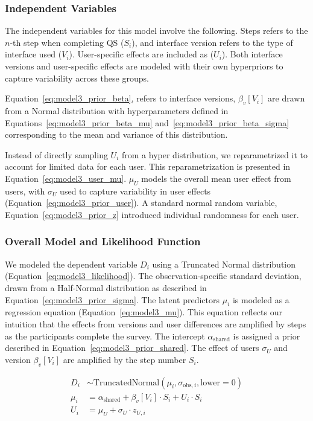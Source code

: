 \subsubsection{Independent Variables}
The independent variables for this model involve the following. Steps refers to the $n$-th step when completing QS ($S_i$), and interface version refers to the type of interface used ($V_i$). User-specific effects are included as ($U_i$). Both interface versions and user-specific effects are modeled with their own hyperpriors to capture variability across these groups. 

Equation~\ref{eq:model3_prior_beta}, refers to interface versions, $\beta_v[V_i]$ are drawn from a Normal distribution with hyperparameters defined in Equations~\ref{eq:model3_prior_beta_mu} and~\ref{eq:model3_prior_beta_sigma} corresponding to the mean and variance of this distribution. 

Instead of directly sampling $U_i$ from a hyper distribution, we reparametrized it to account for limited data for each user. This reparametrization is presented in Equation~\ref{eq:model3_user_mu}. $\mu_{U}$ models the overall mean user effect from users, with $\sigma_{U}$ used to capture variability in user effects (Equation~\ref{eq:model3_prior_user}). A standard normal random variable, Equation~\ref{eq:model3_prior_z} introduced individual randomness for each user.


\subsubsection{Overall Model and Likelihood Function}
We modeled the dependent variable $D_i$ using a Truncated Normal distribution (Equation~\ref{eq:model3_likelihood}). The observation-specific standard deviation, drawn from a Half-Normal distribution as described in Equation~\ref{eq:model3_prior_sigma}. The latent predictors $\mu_i$ is modeled as a regression equation (Equation~\ref{eq:model3_mu}). This equation reflects our intuition that the effects from versions and user differences are amplified by steps as the participants complete the survey. The intercept $\alpha_{\text{shared}}$ is assigned a prior described in Equation~\ref{eq:model3_prior_shared}. The effect of users $\sigma_{U}$ and version $\beta_v[V_i]$ are amplified by the step number $S_i$.


\begin{align}
    D_i &\sim \text{TruncatedNormal}(\mu_i, \sigma_{\text{obs},i}, \text{lower}=0) \label{eq:model3_likelihood} \\
    \mu_i &= \alpha_{\text{shared}} + \beta_v[V_i] \cdot S_i + U_i \cdot S_i \label{eq:model3_mu} \\
    U_i &= \mu_{U} + \sigma_{U} \cdot z_{U,i} \label{eq:model3_user_mu}
\end{align}

